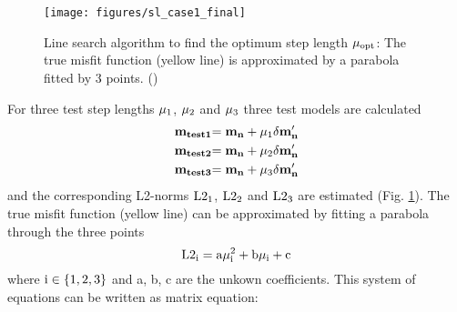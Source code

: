 \begin{figure}[ht]
\begin{center}
\texttt{[image: figures/sl\_case1\_final]}
\caption{Line search algorithm to find the optimum step length $\rm{\mu_{opt}}$: The true misfit function (yellow line) is approximated by a parabola fitted by 3 points. (\cite{koehn:11})}
\label{sl_case1_final}
\end{center}
\end{figure}
For three test step lengths $\rm{\mu_1}$, $\rm{\mu_2}$ and $\rm{\mu_3}$ three test models are calculated 
\begin{equation}
\begin{split}
\rm{\mathbf{m_{test1}}} &\rm{= \mathbf{m_{n}} + \mu_1 \delta \mathbf{m'_n}}\\
\rm{\mathbf{m_{test2}}} &\rm{= \mathbf{m_{n}} + \mu_2 \delta \mathbf{m'_n}}\\
\rm{\mathbf{m_{test3}}} &\rm{= \mathbf{m_{n}} + \mu_3 \delta \mathbf{m'_n}}\\
\end{split}
\label{parabola1:1}
\end{equation}              
and the corresponding L2-norms $\rm{L2_1}$, $\rm{L2_2}$ and $\rm{L2_3}$ are estimated (Fig. \ref{sl_case1_final}). The true misfit function (yellow line) can be approximated by fitting a parabola through the three points
\begin{equation}
\rm{L2_i = a \mu_i^2 + b \mu_i + c}
\label{parabola}
\end{equation}              
where $\rm{i \in \{1,2,3\}}$ and a, b, c are the unkown coefficients. 
This system of equations can be written as matrix equation:
